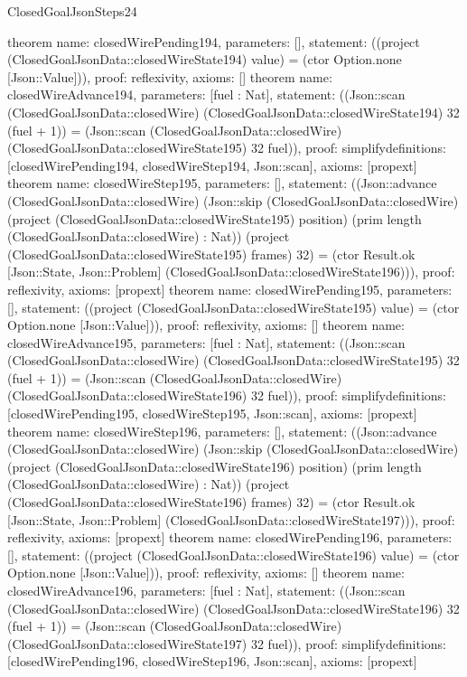\begin{lexlean}{ClosedGoalJsonSteps24}
\begin{semanticmodule}
{}
theorem{
 name: closedWirePending194, parameters: [],
 statement: ((project (ClosedGoalJsonData::closedWireState194) value) = (ctor Option.none [Json::Value])), proof: reflexivity{}, axioms: []
}
theorem{
 name: closedWireAdvance194, parameters: [fuel : Nat],
 statement: ((Json::scan (ClosedGoalJsonData::closedWire) (ClosedGoalJsonData::closedWireState194) 32 (fuel + 1)) = (Json::scan (ClosedGoalJsonData::closedWire) (ClosedGoalJsonData::closedWireState195) 32 fuel)), proof: simplify{definitions: [closedWirePending194, closedWireStep194, Json::scan]}, axioms: [propext]
}
theorem{
 name: closedWireStep195, parameters: [],
 statement: ((Json::advance (ClosedGoalJsonData::closedWire) (Json::skip (ClosedGoalJsonData::closedWire) (project (ClosedGoalJsonData::closedWireState195) position) (prim length (ClosedGoalJsonData::closedWire) : Nat)) (project (ClosedGoalJsonData::closedWireState195) frames) 32) = (ctor Result.ok [Json::State, Json::Problem] (ClosedGoalJsonData::closedWireState196))), proof: reflexivity{}, axioms: [propext]
}
theorem{
 name: closedWirePending195, parameters: [],
 statement: ((project (ClosedGoalJsonData::closedWireState195) value) = (ctor Option.none [Json::Value])), proof: reflexivity{}, axioms: []
}
theorem{
 name: closedWireAdvance195, parameters: [fuel : Nat],
 statement: ((Json::scan (ClosedGoalJsonData::closedWire) (ClosedGoalJsonData::closedWireState195) 32 (fuel + 1)) = (Json::scan (ClosedGoalJsonData::closedWire) (ClosedGoalJsonData::closedWireState196) 32 fuel)), proof: simplify{definitions: [closedWirePending195, closedWireStep195, Json::scan]}, axioms: [propext]
}
theorem{
 name: closedWireStep196, parameters: [],
 statement: ((Json::advance (ClosedGoalJsonData::closedWire) (Json::skip (ClosedGoalJsonData::closedWire) (project (ClosedGoalJsonData::closedWireState196) position) (prim length (ClosedGoalJsonData::closedWire) : Nat)) (project (ClosedGoalJsonData::closedWireState196) frames) 32) = (ctor Result.ok [Json::State, Json::Problem] (ClosedGoalJsonData::closedWireState197))), proof: reflexivity{}, axioms: [propext]
}
theorem{
 name: closedWirePending196, parameters: [],
 statement: ((project (ClosedGoalJsonData::closedWireState196) value) = (ctor Option.none [Json::Value])), proof: reflexivity{}, axioms: []
}
theorem{
 name: closedWireAdvance196, parameters: [fuel : Nat],
 statement: ((Json::scan (ClosedGoalJsonData::closedWire) (ClosedGoalJsonData::closedWireState196) 32 (fuel + 1)) = (Json::scan (ClosedGoalJsonData::closedWire) (ClosedGoalJsonData::closedWireState197) 32 fuel)), proof: simplify{definitions: [closedWirePending196, closedWireStep196, Json::scan]}, axioms: [propext]
}
\end{semanticmodule}
\end{lexlean}
